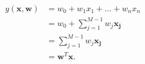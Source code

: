 \begin{equation}
\label{eq:standardlinearregression}
\begin{align*}
y(\mathbf{x, w}) &= w_0 + w_1 x_1 + \ldots + w_n x_n \\
				 &= w_0 + \sum_{j = 1}^{M - 1}{w_j \mathbf{x_j}} \\
				 &= \sum_{j = 1}^{M - 1}{w_j \mathbf{x_j}} \\
				 &= \mathbf{w}^T \mathbf{x} .
\end{align*}
\end{equation}
